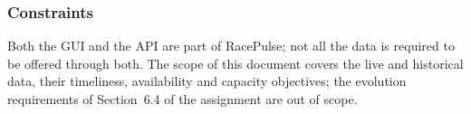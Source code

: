 \documentclass[11pt,a4paper]{article}
\newcommand{\RP}{RacePulse}
\begin{document}
\subsubsection{Constraints}
Both the GUI and the API are part of \RP{}; not all the data is required to be offered through both. The scope of
this document covers the live and historical data, their timeliness, availability and capacity objectives; the
evolution requirements of Section~6.4 of the assignment are out of scope.
\end{document}
